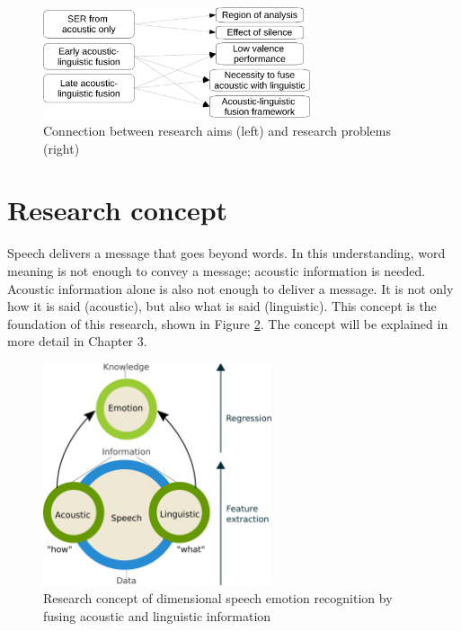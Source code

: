 \begin{figure}[htbp]
    \centering
    \includegraphics[width=0.7\textwidth]{../fig/aims_issues-crop.pdf}
    \caption{Connection between research aims (left) and research problems (right)}
    \label{fig:aims_issues}
\end{figure}

\section{Research concept}
Speech delivers a message that goes beyond words. In this understanding, word
meaning is not enough to convey a message; acoustic information is needed.
Acoustic information alone is also not enough to deliver a message. It is not
only how it is said (acoustic), but also what is said (linguistic).
This concept is the foundation of this research, shown in Figure
\ref{fig:concept}. The concept will be explained
in more detail in Chapter 3.

\begin{figure}[htbp]
    \centering
    \includegraphics[width=0.6\textwidth]{../fig/concept-rev.pdf}
    \caption{Research concept of dimensional speech emotion recognition by fusing acoustic and linguistic information}
    \label{fig:concept}
\end{figure}

